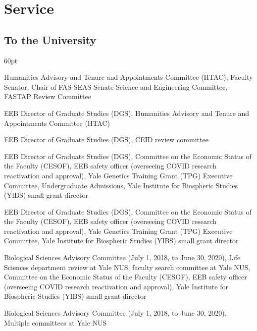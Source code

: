 

\section{Service}

\subsection{To the University}

\begin{entry}{60pt}
\item [\rm 2025] Humanities Advisory and Tenure and Appointments Committee (HTAC), Faculty Senator, Chair of FAS-SEAS Senate Science and Engineering Committee, FASTAP Review Committee

\item [\rm 2024] EEB Director of Graduate Studies (DGS), Humanities Advisory and Tenure and Appointments Committee (HTAC)

\item [\rm 2023] EEB Director of Graduate Studies (DGS), CEID review committee

\item [\rm 2022] EEB Director of Graduate Studies (DGS), Committee on the Economic Status of the Faculty (CESOF), EEB safety officer (overseeing COVID research reactivation and approval), Yale Genetics Training Grant (TPG) Executive Committee, Undergraduate Admissions, Yale Institute for Biospheric Studies (YIBS) small grant director

\item [\rm 2021] EEB Director of Graduate Studies (DGS), Committee on the Economic Status of the Faculty (CESOF), EEB safety officer (overseeing COVID research reactivation and approval), Yale Genetics Training Grant (TPG) Executive Committee, Yale Institute for Biospheric Studies (YIBS) small grant director

\item [\rm 2020] Biological Sciences Advisory Committee (July 1, 2018, to June 30, 2020), Life Sciences department review at Yale NUS, faculty search committee at Yale NUS, Committee on the Economic Status of the Faculty (CESOF), EEB safety officer (overseeing COVID research reactivation and approval), Yale Institute for Biospheric Studies (YIBS) small grant director

\item [\rm 2019] Biological Sciences Advisory Committee (July 1, 2018, to June 30, 2020), Multiple committees at Yale NUS


\end{entry}
